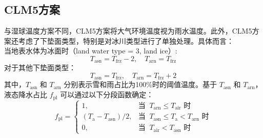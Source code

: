 \subsection{CLM5方案}
与湿球温度方案不同，CLM5方案将大气环境温度视为雨水温度。此外，CLM5方案还考虑了下垫面类型，特别是对冰川类型进行了单独处理。具体而言：\\
当地表水体为冰面时（land water type = 3, land ice）:
\begin{equation}
  T_{\mathrm{asn}} = T_{\mathrm{frz}} - 2,\quad T_{\mathrm{arn}} = T_{\mathrm{frz}}
\end{equation}
对于其他下垫面类型：
\begin{equation}
  T_{\mathrm{asn}} = T_{\mathrm{frz}},\quad T_{\mathrm{arn}} = T_{\mathrm{frz}} +2
\end{equation}
其中，$T_{\mathrm{asn}}$ 和 $T_{\mathrm{arn}}$ 分别表示雪和雨占比为100\%时的阈值温度。基于 $T_{\mathrm{asn}}$ 和 $T_{\mathrm{arn}}$，液态降水占比 $f_{\mathrm{pl}}$ 可以通过以下分段函数确定：
\begin{equation*}
  f_{\mathrm{pl}}= \begin{cases}
    1, & \text{当 }\ T_{\mathrm{arn}}\leqslant T_{\mathrm {air}} \text{ 时}\\
    (T_{\mathrm {a}} - T_{\mathrm{asn}})/2, & \text{当 }\  T_{\mathrm{asn}}\leqslant T_{\mathrm {a}} < T_{\mathrm{arn}} \text{ 时} \\
    0, & \text{当 }\ T_{\mathrm {air}} < T_{\mathrm{asn}} \text{ 时}
  \end{cases}
\end{equation*}


